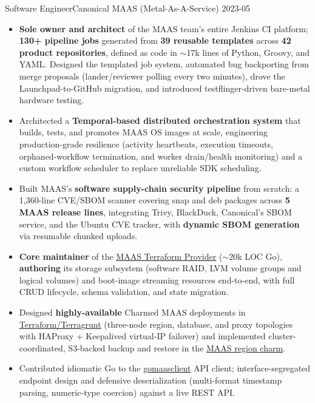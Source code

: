 {Software Engineer}{Canonical MAAS (Metal-As-A-Service)}
{2023-05}{}
{%
\begin{itemize}[leftmargin=*, labelsep=-0.1em, noitemsep]
    \item \textbf{Sole owner and architect} of the MAAS team's entire Jenkins CI platform; \textbf{130+ pipeline jobs} generated from \textbf{39 reusable templates} across \textbf{42 product repositories}, defined as code in $\sim$17k lines of Python, Groovy, and YAML. Designed the templated job system, automated bug backporting from merge proposals (lander/reviewer polling every two minutes), drove the Launchpad-to-GitHub migration, and introduced testflinger-driven bare-metal hardware testing.
    \item Architected a \textbf{Temporal-based distributed orchestration system} that builds, tests, and promotes MAAS OS images at scale, engineering production-grade resilience (activity heartbeats, execution timeouts, orphaned-workflow termination, and worker drain/health monitoring) and a custom workflow scheduler to replace unreliable SDK scheduling.
    \item Built MAAS's \textbf{software supply-chain security pipeline} from scratch: a 1,360-line CVE/SBOM scanner covering snap and deb packages across \textbf{5 MAAS release lines}, integrating Trivy, BlackDuck, Canonical's SBOM service, and the Ubuntu CVE tracker, with \textbf{dynamic SBOM generation} via resumable chunked uploads.
    \item \textbf{Core maintainer} of the \href{https://github.com/canonical/terraform-provider-maas}{MAAS Terraform Provider} ($\sim$20k LOC Go), \textbf{authoring} its storage subsystem (software RAID, LVM volume groups and logical volumes) and boot-image streaming resources end-to-end, with full CRUD lifecycle, schema validation, and state migration.
    \item Designed \textbf{highly-available} Charmed MAAS deployments in \href{https://github.com/canonical/maas-terraform-modules}{Terraform/Terragrunt} (three-node region, database, and proxy topologies with HAProxy + Keepalived virtual-IP failover) and implemented cluster-coordinated, S3-backed backup and restore in the \href{https://github.com/canonical/maas-charms}{MAAS region charm}.
    \item Contributed idiomatic Go to the \href{https://github.com/canonical/gomaasclient}{gomaasclient} API client; interface-segregated endpoint design and defensive deserialization (multi-format timestamp parsing, numeric-type coercion) against a live REST API.
\end{itemize}
}


